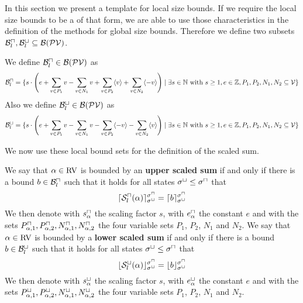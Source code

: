 In this section we present a template for local size bounds.
If we require the local size bounds to be a of that form, we are able to use those characteristics in the definition of the methods for global size bounds.
Therefore we define two subsets $\mathcal{B}^\sqcap_l, \mathcal{B}^\sqcup_l \subseteq \mathcal{B}(\mathcal{PV})$.

\begin{definition}
  We define $\mathcal{B}^\sqcap_l \in \mathcal{B}(\mathcal{PV})$ as 
  \[ \mathcal{B}^\sqcap_l = \lbrace 
    s \cdot \left(
        e
      + \sum_{v \in P_1} v
      - \sum_{v \in N_1} v
      + \sum_{v \in P_2} \langle v\rangle
      + \sum_{v \in N_2} \langle-v\rangle
      \right) \mid \exists s \in \mathbb{N} \text{ with } s \geq 1, e \in \mathbb{Z}, P_1, P_2, N_1, N_2 \subseteq \mathcal{V}  \rbrace\]
  Also we define $\mathcal{B}^\sqcup_l \in \mathcal{B}(\mathcal{PV})$ as 
  \[ \mathcal{B}^\sqcup_l = \lbrace 
    s \cdot \left(
        e
      + \sum_{v \in P_1} v
      - \sum_{v \in N_1} v
      - \sum_{v \in P_2} \langle-v\rangle
      - \sum_{v \in N_2} \langle v\rangle
      \right) \mid \exists s \in \mathbb{N} \text{ with } s \geq 1, e \in \mathbb{Z}, P_1, P_2, N_1, N_2 \subseteq \mathcal{V}  \rbrace\]
\end{definition}

We now use these local bound sets for the definition of the scaled sum.

\begin{definition}
  We say that $\alpha \in \text{RV}$ is bounded by an \textbf{upper scaled sum} if and only if there is a bound $b \in \mathcal{B}^\sqcap_l$ such that it holds for all states ${\sigma^\sqcup} \leq {\sigma^\sqcap}$ that
  \[ \lceil {\mathcal{S}^\sqcap_l}(\alpha) \rceil^{{\sigma^\sqcap}}_{{\sigma^\sqcup}} = \lceil b \rceil^{{\sigma^\sqcap}}_{{\sigma^\sqcup}} \]
  We then denote with $s^\sqcap_\alpha$ the scaling factor $s$, with $e^\sqcap_\alpha$ the constant $e$ and with the sets $P_{\alpha,1}^\sqcap, P_{\alpha,2}^\sqcap, N_{\alpha,1}^\sqcap, N_{\alpha,2}^\sqcap$ the four variable sets $P_1$, $P_2$, $N_1$ and $N_2$.
  We say that $\alpha \in \text{RV}$ is bounded by a \textbf{lower scaled sum} if and only if there is a bound $b \in \mathcal{B}^\sqcup_l$ such that it holds for all states ${\sigma^\sqcup} \leq {\sigma^\sqcap}$ that
  \[ \lfloor {\mathcal{S}^\sqcup_l}(\alpha) \rfloor^{{\sigma^\sqcap}}_{{\sigma^\sqcup}} = \lfloor b \rfloor^{{\sigma^\sqcap}}_{{\sigma^\sqcup}} \]
  We then denote with $s^\sqcup_\alpha$ the scaling factor $s$, with $e^\sqcup_\alpha$ the constant $e$ and with the sets $P_{\alpha,1}^\sqcup, P_{\alpha,2}^\sqcup, N_{\alpha,1}^\sqcup, N_{\alpha,2}^\sqcup$ the four variable sets $P_1$, $P_2$, $N_1$ and $N_2$.
\end{definition}


